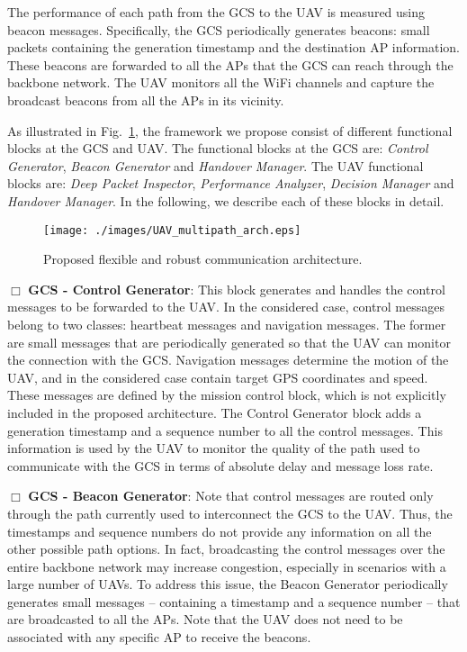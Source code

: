 The performance of each path from the GCS to the UAV is measured using beacon messages. Specifically, the GCS periodically generates beacons: small packets containing the generation timestamp and the destination AP information. These beacons are forwarded to all the APs that the GCS can reach through the backbone network.
The UAV monitors all the WiFi channels and capture the broadcast beacons from all the APs in its vicinity.

As illustrated in Fig.~\ref{fig:sysarch}, the framework we propose consist of different functional blocks at the GCS and UAV. The functional blocks at the GCS are: \emph{Control Generator}, \emph{Beacon Generator} and \emph{Handover Manager}. The UAV functional blocks are: \emph{Deep Packet Inspector}, \emph{Performance Analyzer}, \emph{Decision Manager} and \emph{Handover Manager}. In the following, we describe each of these blocks in detail.

\begin{figure}[!t]
\centering   \texttt{[image: ./images/UAV\_multipath\_arch.eps]}
\vspace{-6mm}
\caption{Proposed flexible and robust communication architecture.}
\vspace{-6mm}
\label{fig:sysarch}
\end{figure}

\noindent
$\Box$ {\bf{GCS - Control Generator}}: 
This block generates and handles the control messages to be forwarded to the UAV. In the considered case, control messages belong to two classes: heartbeat messages and navigation messages. The former are small messages that are periodically generated so that the UAV can monitor the connection with the GCS. Navigation messages determine the motion of the UAV, and in the considered case contain target GPS coordinates and speed. These messages are defined by the mission control block, which is not explicitly included in the proposed architecture. The Control Generator block adds a generation timestamp and a sequence number to all the control messages. This information is used by the UAV to monitor the quality of the path used to communicate with the GCS in terms of absolute delay and message loss rate.  


\vspace{1mm}
\noindent
$\Box$ {\bf{GCS - Beacon Generator}}: 
Note that control messages are routed only through the path currently used to interconnect the GCS to the UAV. Thus, the timestamps and sequence numbers do not provide any information on all the other possible path options. In fact, broadcasting the control messages over the entire backbone network may increase congestion, especially in scenarios with a large number of UAVs. To address this issue, the Beacon Generator periodically generates small messages -- containing a timestamp and a sequence number -- that are broadcasted to all the APs. Note that the UAV does not need to be associated with any specific AP to receive the beacons.

